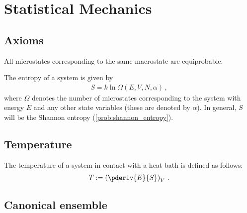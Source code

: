 \chapter{Statistical Mechanics}

\section{Axioms}

    \begin{axiom}
        All microstates corresponding to the same macrostate are equiprobable.
    \end{axiom}

    \begin{axiom}\label{statmech:boltzmann_formula}
        The entropy of a system is given by
        \begin{gather}
            S = k\ln\Omega(E,V,N,\alpha)\,,
        \end{gather}
        where $\Omega$ denotes the number of microstates corresponding to the system with energy $E$ and any other state variables (these are denoted by $\alpha$). In general, $S$ will be the Shannon entropy (\cref{prob:shannon_entropy}).
    \end{axiom}

\section{Temperature}

    \begin{definition}\label{statmech:temperature}
        The temperature of a system in contact with a heat bath is defined as follows:
        \begin{gather}
            T := \left(\pderiv{E}{S}\right)_V\,.
        \end{gather}
    \end{definition}

\section{Canonical ensemble}


